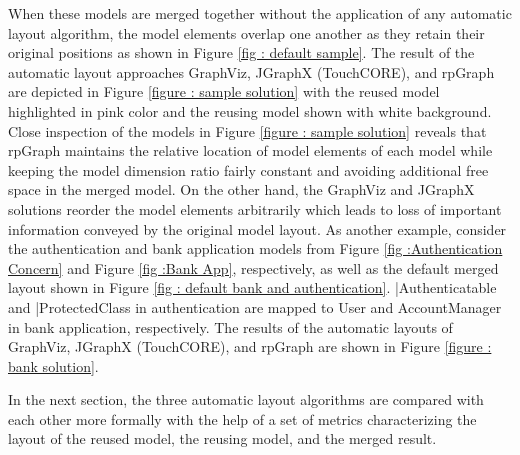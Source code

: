 When these models are merged together without the application of any automatic layout algorithm, the model elements overlap one another as they retain their original positions as shown in Figure \ref{fig : default sample}. The result of the automatic layout approaches GraphViz, JGraphX (TouchCORE), and rpGraph are depicted in Figure \ref{figure : sample solution}  with the reused model highlighted in pink color and the reusing model shown with white background. Close inspection of the models in Figure \ref{figure : sample solution} reveals that rpGraph maintains the relative location of model elements of each model while keeping the model dimension ratio fairly constant and avoiding additional free space in the merged model. On the other hand, the GraphViz and JGraphX solutions reorder the model elements arbitrarily which leads to loss of important information conveyed by the original model layout.  As another example, consider the authentication and bank application models from Figure \ref{fig :Authentication Concern} and Figure \ref{fig :Bank App}, respectively, as well as the default merged layout shown in Figure \ref{fig : default bank and authentication}. |Authenticatable and |ProtectedClass in authentication are mapped to User and AccountManager in  bank application, respectively. The results of the automatic layouts of GraphViz, JGraphX (TouchCORE), and rpGraph are shown in Figure \ref{figure : bank solution}.  

In the next section, the three automatic layout algorithms are compared with each other more formally with the help of a set of metrics characterizing the layout of the reused model, the reusing model, and the merged result.


